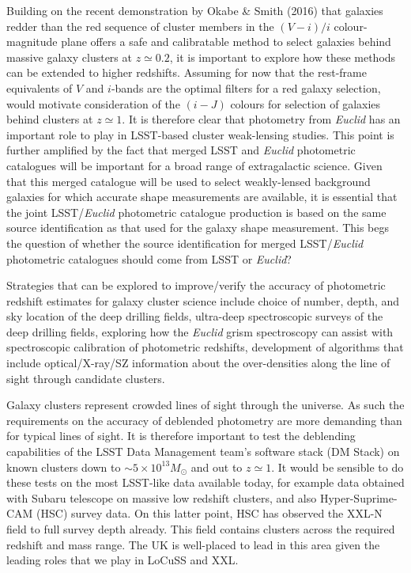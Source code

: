 \documentclass[a4paper,11pt]{article}
\begin{document}
Building on the recent demonstration by Okabe \& Smith (2016) that
galaxies redder than the red sequence of cluster members in the
$(V-i)/i$ colour-magnitude plane offers a safe and calibratable method
to select galaxies behind massive galaxy clusters at $z\simeq0.2$, it
is important to explore how these methods can be extended to higher
redshifts.  Assuming for now that the rest-frame equivalents of $V$
and $i$-bands are the optimal filters for a red galaxy selection,
would motivate consideration of the $(i-J)$ colours for selection of
galaxies behind clusters at $z\simeq1$.  It is therefore clear that
photometry from \emph{Euclid} has an important role to play in
LSST-based cluster weak-lensing studies.  This point is further
amplified by the fact that merged LSST and \emph{Euclid} photometric
catalogues will be important for a broad range of extragalactic
science.  Given that this merged catalogue will be used to select
weakly-lensed background galaxies for which accurate shape
measurements are available, it is essential that the joint
LSST/\emph{Euclid} photometric catalogue production is based on the
same source identification as that used for the galaxy shape
measurement.  This begs the question of whether the source
identification for merged LSST/\emph{Euclid} photometric catalogues
should come from LSST or \emph{Euclid}?

Strategies that can be explored to improve/verify the accuracy of
photometric redshift estimates for galaxy cluster science include
choice of number, depth, and sky location of the deep drilling fields,
ultra-deep spectroscopic surveys of the deep drilling fields,
exploring how the \emph{Euclid} grism spectroscopy can assist with
spectroscopic calibration of photometric redshifts, development of
algorithms that include optical/X-ray/SZ information about the
over-densities along the line of sight through candidate clusters.

Galaxy clusters represent crowded lines of sight through the universe.
As such the requirements on the accuracy of deblended photometry are
more demanding than for typical lines of sight.  It is therefore
important to test the deblending capabilities of the LSST Data
Management team's software stack (DM Stack) on known clusters down to
$\sim5\times10^{13}M_\odot$ and out to $z\simeq1$.  It would be
sensible to do these tests on the most LSST-like data available today,
for example data obtained with Subaru telescope on massive low
redshift clusters, and also Hyper-Suprime-CAM (HSC) survey data.  On
this latter point, HSC has observed the XXL-N field to full survey
depth already.  This field contains clusters across the required
redshift and mass range.  The UK is well-placed to lead in this area
given the leading roles that we play in LoCuSS and XXL.
\end{document}
